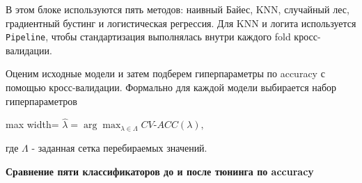 \documentclass[11pt]{article}
\begin{document}
В этом блоке используются пять методов: наивный Байес, KNN, случайный
лес, градиентный бустинг и логистическая регрессия. Для KNN и логита
используется \texttt{Pipeline}, чтобы стандартизация выполнялась внутри
каждого fold кросс-валидации.

    Оценим исходные модели и затем подберем гиперпараметры по accuracy с
помощью кросс-валидации. Формально для каждой модели выбирается набор
гиперпараметров

\begin{center}
\begin{adjustbox}{max width=\linewidth}
\(\displaystyle \hat\lambda = \arg\max_{\lambda \in \Lambda} CV\text{-}ACC(\lambda),\)
\end{adjustbox}
\end{center}

где \(\Lambda\) - заданная сетка перебираемых значений.

    \textbf{Сравнение пяти классификаторов до и после тюнинга по accuracy}
\end{document}
